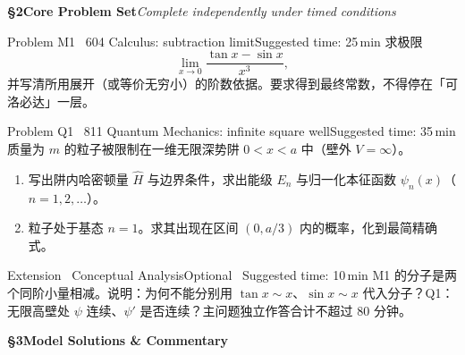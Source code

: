\documentclass[a4paper,11pt]{article}
\begin{document}
\clearpage

{\Large\sffamily\bfseries\color{navy} \S 2\quad Core Problem Set}\hfill{\small\sffamily\color{mist}\itshape Complete independently under timed conditions}

\vspace{8pt}

\begin{problem}{Problem M1 \textbar\ 604 Calculus: subtraction limit}{Suggested time: 25\,min}
求极限
\[
  \lim_{x\to 0}\frac{\tan x-\sin x}{x^3},
\]
并写清所用展开（或等价无穷小）的阶数依据。要求得到最终常数，不得停在「可洛必达」一层。
\end{problem}

\vspace{6pt}

\begin{problem}{Problem Q1 \textbar\ 811 Quantum Mechanics: infinite square well}{Suggested time: 35\,min}
质量为 $m$ 的粒子被限制在一维无限深势阱 $0<x<a$ 中（壁外 $V=\infty$）。
\begin{enumerate}[leftmargin=1.6em,itemsep=2pt,topsep=2pt]
  \item 写出阱内哈密顿量 $\hat{H}$ 与边界条件，求出能级 $E_n$ 与归一化本征函数 $\psi_n(x)$（$n=1,2,\ldots$）。
  \item 粒子处于基态 $n=1$。求其出现在区间 $(0,a/3)$ 内的概率，化到最简精确式。
\end{enumerate}
\end{problem}

\vspace{6pt}

\begin{problem}{Extension \textbar\ Conceptual Analysis}{Optional \textperiodcentered\ Suggested time: 10\,min}
M1 的分子是两个同阶小量相减。说明：为何不能分别用 $\tan x\sim x$、$\sin x\sim x$ 代入分子？Q1：无限高壁处 $\psi$ 连续、$\psi'$ 是否连续？主问题独立作答合计不超过 80 分钟。
\end{problem}

\clearpage

{\Large\sffamily\bfseries\color{navy} \S 3\quad Model Solutions \& Commentary}
\end{document}
